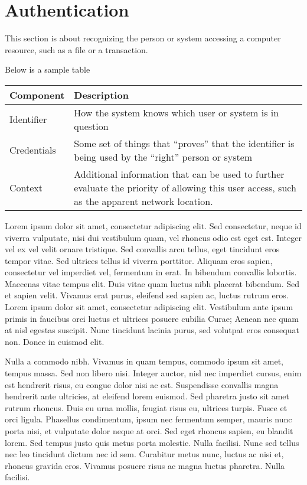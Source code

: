 \hypertarget{authentication}{%
\chapter{Authentication}\label{authentication}}

This section is about recognizing the person or system accessing a
computer resource, such as a file or a transaction.

Below is a sample table

\begin{table}
\caption{Components of Authentication}
\begin{longtable}[]{l p{4in}}
\toprule
Component & Description\tabularnewline
\midrule
\endhead
Identifier & How the system knows which user or system is in
question\tabularnewline
Credentials & Some set of things that ``proves'' that the identifier is
being used by the ``right'' person or system\tabularnewline
Context & Additional information that can be used to further evaluate
the priority of allowing this user access, such as the apparent network
location.\tabularnewline
\bottomrule
\end{longtable}
\end{table}


Lorem ipsum dolor sit amet, consectetur adipiscing elit. Sed
consectetur, neque id viverra vulputate, nisi dui vestibulum quam, vel
rhoncus odio est eget est. Integer vel ex vel velit ornare tristique.
Sed convallis arcu tellus, eget tincidunt eros tempor vitae. Sed
ultrices tellus id viverra porttitor. Aliquam eros sapien, consectetur
vel imperdiet vel, fermentum in erat. In bibendum convallis lobortis.
Maecenas vitae tempus elit. Duis vitae quam luctus nibh placerat
bibendum. Sed et sapien velit. Vivamus erat purus, eleifend sed sapien
ac, luctus rutrum eros. Lorem ipsum dolor sit amet, consectetur
adipiscing elit. Vestibulum ante ipsum primis in faucibus orci luctus et
ultrices posuere cubilia Curae; Aenean nec quam at nisl egestas
suscipit. Nunc tincidunt lacinia purus, sed volutpat eros consequat non.
Donec in euismod elit.

Nulla a commodo nibh. Vivamus in quam tempus, commodo ipsum sit amet,
tempus massa. Sed non libero nisi. Integer auctor, nisl nec imperdiet
cursus, enim est hendrerit risus, eu congue dolor nisi ac est.
Suspendisse convallis magna hendrerit ante ultricies, at eleifend lorem
euismod. Sed pharetra justo sit amet rutrum rhoncus. Duis eu urna
mollis, feugiat risus eu, ultrices turpis. Fusce et orci ligula.
Phasellus condimentum, ipsum nec fermentum semper, mauris nunc porta
nisi, et vulputate dolor neque at orci. Sed eget rhoncus sapien, eu
blandit lorem. Sed tempus justo quis metus porta molestie. Nulla
facilisi. Nunc sed tellus nec leo tincidunt dictum nec id sem. Curabitur
metus nunc, luctus ac nisi et, rhoncus gravida eros. Vivamus posuere
risus ac magna luctus pharetra. Nulla facilisi.

